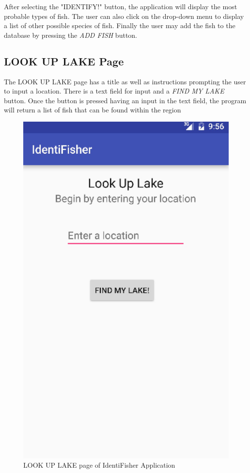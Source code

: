 \documentclass{article}
\begin{document}
After selecting the "IDENTIFY!" button, the application will display the most probable types of fish. The user can also click on the drop-down
menu to display a list of other possible species of fish. Finally the user may add the fish to the database by pressing the \textit{ADD FISH} button.\\

\subsection{LOOK UP LAKE Page}
The LOOK UP LAKE page has a title as well as instructions prompting the user to input a location. There is a text field for input and a
\textit{FIND MY LAKE} button. Once the button is pressed having an input in the text field, the program will return a list of fish that can be found within the
region\\
\begin{figure}[H]
	\includegraphics[scale=0.30]{Lookup.png}
	\caption{LOOK UP LAKE page of IdentiFisher Application}
\end{figure}
\end{document}
